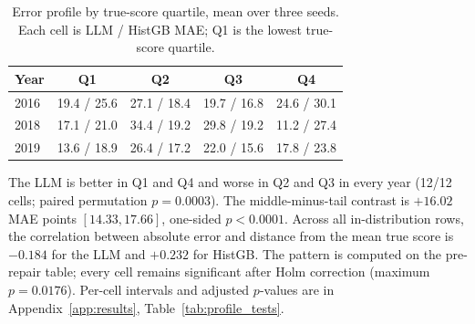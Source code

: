 \begin{table}[t]
\centering
\small
\caption{Error profile by true-score quartile, mean over three seeds. Each cell
is LLM / HistGB MAE; Q1 is the lowest true-score quartile.}
\label{tab:profile}
\begin{tabular}{lcccc}
\toprule
Year & Q1 & Q2 & Q3 & Q4 \\
\midrule
2016 & 19.4 / 25.6 & 27.1 / 18.4 & 19.7 / 16.8 & 24.6 / 30.1 \\
2018 & 17.1 / 21.0 & 34.4 / 19.2 & 29.8 / 19.2 & 11.2 / 27.4 \\
2019 & 13.6 / 18.9 & 26.4 / 17.2 & 22.0 / 15.6 & 17.8 / 23.8 \\
\bottomrule
\end{tabular}
\par\smallskip\footnotesize
The LLM is better in Q1 and Q4 and worse in Q2 and Q3 in every year (12/12
cells; paired permutation $p=0.0003$). The middle-minus-tail contrast is
$+16.02$ MAE points $[14.33, 17.66]$, one-sided $p<0.0001$. Across all
in-distribution rows, the correlation between absolute error and distance from
the mean true score is $-0.184$ for the LLM and $+0.232$ for HistGB. The
pattern is computed on the pre-repair table; every cell remains significant
after Holm correction (maximum $p=0.0176$). Per-cell intervals and adjusted
$p$-values are in Appendix~\ref{app:results}, Table~\ref{tab:profile_tests}.
\end{table}
